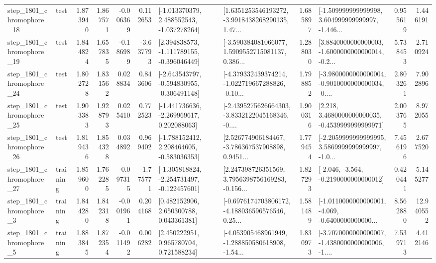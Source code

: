 \begin{tabular}{llrrrrllrlrr}
 step\_1801\_chromophore\_18 &      test &      1.873940 &    1.867571 &     -0.006369 &  0.112653 &   [-1.013370379, 2.488552543, -1.037278264] &  [1.6351253546193272, -3.9918438268290135, 1.47... &       1.685897 &  [-1.509999999999998, 3.604999999999997, -1.446... &            0.955619 &          1.446191 \\
 step\_1801\_chromophore\_19 &      test &      1.844824 &    1.657835 &     -0.186989 & -3.637793 &   [2.394838573, -1.111789155, -0.396046449] &  [-3.590384081066077, 1.5909552715081137, 0.386... &       1.288030 &  [3.8840000000000003, -1.6000000000000014, -0.2... &            5.738453 &          2.710924 \\
 step\_1801\_chromophore\_24 &      test &      1.802728 &    1.831562 &      0.028834 &  0.843606 &  [-2.643543797, -0.594830955, -0.306491148] &  [-4.379332439374214, -1.022719667288826, -0.10... &       1.798852 &  [-3.9800000000000004, -0.9010000000000034, -0.... &            2.803261 &          7.902896 \\
 step\_1801\_chromophore\_25 &      test &      1.903383 &    1.928793 &      0.025410 &  0.772523 &   [-1.441736636, -2.269969617, 0.202088063] &  [-2.4395275626664303, -3.8332122045168346, -0.... &       1.900316 &   [2.218, 3.4680000000000035, -0.4539999999999971] &            2.003765 &          8.972055 \\
 step\_1801\_chromophore\_26 &      test &      1.819436 &    1.854328 &      0.034892 &  0.969402 &   [-1.788152412, 2.208464605, -0.583036353] &  [2.526774906184467, -3.786367537908898, 0.9451... &       1.779454 &  [-2.2059999999999995, 3.5869999999999997, -1.0... &            7.456196 &          2.677520 \\
 step\_1801\_chromophore\_27 &  training &      1.859600 &    1.762285 &     -0.097315 & -1.775771 &  [-1.305818824, -2.254731497, -0.122457601] &  [2.247398726351569, 3.7956398756169283, -0.156... &       1.827293 &              [-2.046, -3.564, -0.2190000000000012] &            0.420441 &          5.145277 \\
  step\_1801\_chromophore\_3 &  training &      1.844280 &    1.842318 &     -0.001961 &  0.204168 &     [0.482152906, 2.650300788, 0.043361381] &  [-0.6976174703806172, -4.188036596576546, 0.25... &       1.581489 &  [-1.0110000000000001, -4.069, -0.6400000000000... &            8.562880 &         12.940552 \\
  step\_1801\_chromophore\_5 &  training &      1.883845 &    1.872354 &     -0.011492 &  0.006282 &     [2.450222951, 0.965780704, 0.721588234] &  [-4.053905468961949, -1.288850580618908, -1.54... &       1.830973 &  [-3.7070000000000007, -1.4380000000000006, -1.... &            7.539713 &          4.412146 \\

\end{tabular}
